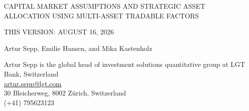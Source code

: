 \documentclass[pdftex,12pt,a4paper]{article}
\begin{document}
%



\begin{center}
\large CAPITAL MARKET ASSUMPTIONS AND STRATEGIC ASSET ALLOCATION USING MULTI-ASSET TRADABLE FACTORS
\end{center}

\begin{center}
THIS VERSION: AUGUST 16, 2026
\end{center}

\begin{center}
Artur Sepp, Emilie Hansen, and Mika Kastenholz
\end{center}

\noindent Artur Sepp is the global head of investment solutions quantitative group at LGT Bank, Switzerland\\
\underline{\href{mailto:artur.sepp@lgt.com}{artur.sepp@lgt.com}}\\
30 Bleicherweg, 8002 Z\"urich, Switzerland\\
(+41) 795623123\\
\end{document}
